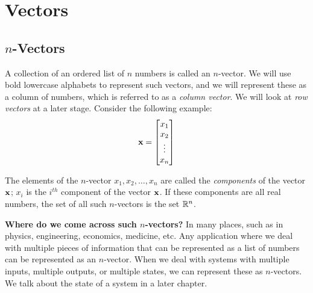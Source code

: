 \chapter{Vectors}\label{chp:vectors}


\section{$n$-Vectors}
A collection of an ordered list of $n$ numbers is called an $n$-vector. We will use bold lowercase alphabets to represent such vectors, and we will represent these as a column of numbers, which is referred to as a \textit{column vector}. We will look at \textit{row vectors} at a later stage. Consider the following example:
\[ \mf{x} = \bmxc x_1 \\ x_2 \\ \vdots \\x_n \emx \]

The elements of the $n$-vector $x_1, x_2, \ldots, x_n$ are called the \textit{components} of the vector $\mathbf{x}$; $x_i$ is the $i^{th}$ component of the vector $\mathbf{x}$. If these components are all real numbers, the set of all such $n$-vectors is the set $\mathbb{R}^n$.

\noindent \textbf{Where do we come across such $n$-vectors?} In many places, such as in physics, engineering, economics, medicine, etc. Any application where we deal with multiple pieces of information that can be represented as a list of numbers can be represented as an $n$-vector. When we deal with systems with multiple inputs, multiple outputs, or multiple states, we can represent these as $n$-vectors. We talk about the state of a system in a later chapter.

